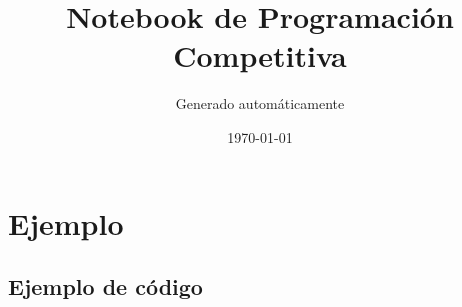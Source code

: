 \documentclass[10pt,twocolumn]{article}
\title{Notebook de Programación Competitiva}
\author{Generado automáticamente}
\date{\today}
\begin{document}
\maketitle
\tableofcontents
\vspace{0.5cm}


\section{Ejemplo}
\subsection{Ejemplo de código}

\end{document}
